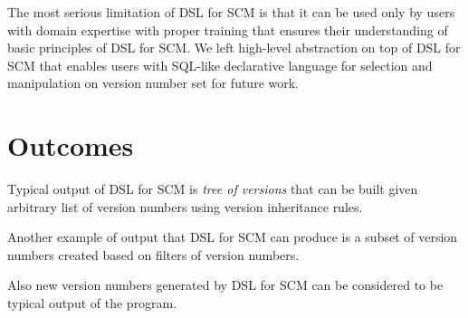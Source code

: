 \documentclass[11pt]{article}
\begin{document}


The most serious limitation of DSL for SCM is that it can be used only by users with domain expertise with proper training that ensures their understanding of basic principles of DSL for SCM. We left high-level abstraction on top of DSL for SCM that enables users with SQL-like declarative language for selection and manipulation on version number set for future work.

\section{Outcomes}
\label{sec:outcomes}


Typical output of DSL for SCM is \textit{tree of versions} that can be built given arbitrary list of version numbers using version inheritance rules. 

Another example of output that DSL for SCM can produce is a subset of version numbers created based on filters of version numbers.

Also new version numbers generated by DSL for SCM can be considered to be typical output of the program.

\end{document}
